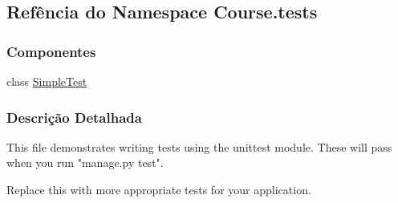 \hypertarget{namespaceCourse_1_1tests}{\subsection{Refência do Namespace Course.\-tests}
\label{namespaceCourse_1_1tests}
}
\subsubsection*{Componentes}
\begin{DoxyCompactItemize}
\item 
class \hyperlink{classCourse_1_1tests_1_1SimpleTest}{Simple\-Test}
\end{DoxyCompactItemize}


\subsubsection{Descrição Detalhada}
\begin{DoxyVerb}This file demonstrates writing tests using the unittest module. These will pass
when you run "manage.py test".

Replace this with more appropriate tests for your application.
\end{DoxyVerb}
 